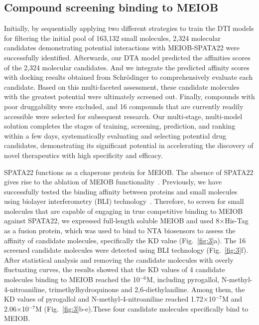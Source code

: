 \documentclass[unnumsec,webpdf,contemporary,large]{oup-authoring-template}%
\theoremstyle{thmstyleone}%
\theoremstyle{thmstyletwo}%
\theoremstyle{thmstylethree}%
\begin{document}
\subsection*{Compound screening binding to MEIOB}

Initially, by sequentially applying two different strategies to train the DTI models for filtering the initial pool of 163,132 small molecules, 2,324 molecular candidates demonstrating potential interactions with MEIOB-SPATA22 were successfully identified. Afterwards, our DTA model predicted the affinities scores of the 2,324 molecular candidates. And we integrate the predicted affinity scores with docking results obtained from Schrödinger to comprehensively evaluate each candidate. Based on this multi-faceted assessment, these candidate molecules with the greatest potential were ultimately screened out. Finally, compounds with poor druggability were excluded, and 16 compounds that are currently readily accessible were selected for subsequent research. Our multi-stage, multi-model solution completes the stages of training, screening, prediction, and ranking within a few days, systematically evaluating and selecting potential drug candidates, demonstrating its significant potential in accelerating the discovery of novel therapeutics with high specificity and efficacy.

SPATA22 functions as a chaperone protein for MEIOB. The absence of SPATA22 gives rise to the ablation of MEIOB functionality~\cite{6,9,10}. Previously, we have successfully tested the binding affinity between proteins and small molecules using biolayer interferometry (BLI) technology~\cite{11}. Therefore, to screen for small molecules that are capable of engaging in true competitive binding to MEIOB against SPATA22, we expressed full-length soluble MEIOB and used 8×His-Tag as a fusion protein, which was used to bind to NTA biosensors to assess the affinity of candidate molecules, specifically the $\text{KD}$ value (Fig.~\ref{fig:3}a). The 16 screened candidate molecules were detected using BLI technology (Fig.~\ref{fig:3}f). After statistical analysis and removing the candidate molecules with overly fluctuating curves, the results showed that the $\text{KD}$ values of 4 candidate molecules binding to MEIOB reached the 10$^{-6}$M, including pyrogallol, N-methyl-4-nitroaniline, trimethylhydroquinone and 2,6-diethylaniline. Among them, the $\text{KD}$ values of pyrogallol and N-methyl-4-nitroaniline reached 1.72×10$^{-7}$M and 2.06×10$^{-7}$M (Fig.~\ref{fig:3}b-e).These four candidate molecules specifically bind to MEIOB.
\end{document}

